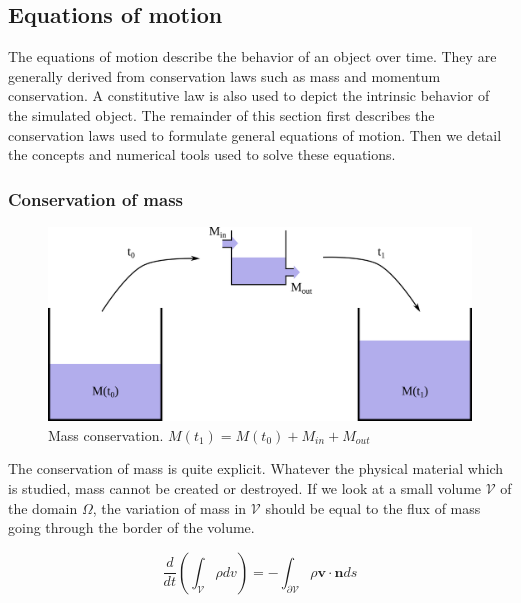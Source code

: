 \subsection{Equations of motion}

The equations of motion describe the behavior of an object over time.
They are generally derived from conservation laws such as mass and momentum conservation. 
A constitutive law is also used to depict the intrinsic behavior of the simulated object.
The remainder of this section first describes the conservation laws used to formulate general equations of motion.
Then we detail the concepts and numerical tools used to solve these equations.

\subsubsection{Conservation of mass}

\begin{figure}[!h]
\centering
\includegraphics[scale=0.8]{images/continuum_mechanics/massConservation.png}
\caption[STAR mechanics: Mass conservation]{\label{fig:massConservation} Mass conservation. $M(t_{1}) = M(t_{0}) + M_{in} + M_{out}$}
\end{figure}

The conservation of mass is quite explicit. 
Whatever the physical material which is studied, mass cannot be created or destroyed. 
If we look at a small volume $\mathcal{V}$ of the domain $\Omega$, the variation of mass in $\mathcal{V}$ should be equal to the flux of mass going through the border of the volume.

\begin{equation}
    \label{eq:massConservation}
    \displaystyle 
    \frac{d}{dt}\left( \int_{\mathcal{V}} \rho dv \right)
    =
    - \int_{\mathcal{\partial V}}\rho \mathbf{v} \cdot \mathbf{n} ds
\end{equation}

